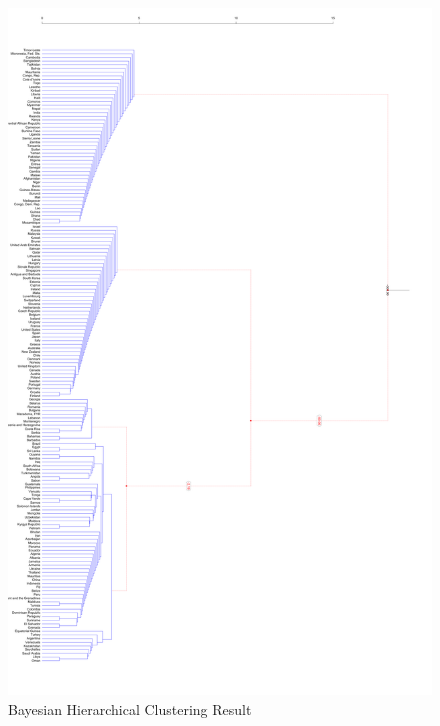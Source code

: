 \begin{figure}[H]
    \caption{Bayesian Hierarchical Clustering Result}
    \includegraphics[width=\textwidth]{000005.png}
\end{figure}


